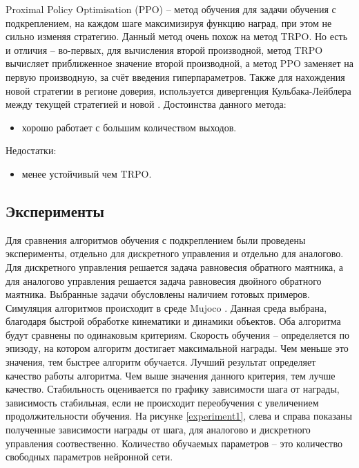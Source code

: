 Proximal Policy Optimisation (PPO) -- метод обучения для задачи обучения с подкреплением, на каждом шаге максимизируя функцию наград, при этом не сильно изменяя стратегию. 
Данный метод очень похож на метод TRPO. 
Но есть и отличия -- во-первых, для вычисления второй производной, метод TRPO вычисляет приближенное значение второй производной, а  метод PPO  заменяет на первую производную, за счёт введения гиперпараметров. 
Также для нахождения новой стратегии в регионе доверия, используется дивергенция Кульбака-Лейблера между текущей стратегией и новой \cite{ppo}.
Достоинства данного метода:
\begin{itemize}
	\item хорошо работает с большим количеством выходов.
\end{itemize}

Недостатки:
\begin{itemize}
	\item менее устойчивый чем TRPO.
\end{itemize} 



\subsection{Эксперименты}
Для сравнения алгоритмов обучения с подкреплением были проведены эксперименты, отдельно для дискретного управления и отдельно для аналогово. 
Для дискретного управления решается задача равновесия обратного маятника, а для аналогово управления решается задача равновесия двойного обратного маятника. 
Выбранные задачи обусловлены наличием готовых примеров. 
Симуляция алгоритмов происходит в среде Mujoco \cite{mujoco}. Данная среда выбрана, благодаря быстрой обработке кинематики и динамики объектов.
Оба алгоритма будут сравнены по одинаковым критериям. 
Скорость обучения -- определяется по эпизоду, на котором алгоритм достигает максимальной награды. 
Чем меньше это значения, тем быстрее алгоритм обучается. 
Лучший результат определяет качество работы алгоритма. 
Чем выше значения данного критерия, тем лучше качество. 
Стабильность оценивается по графику зависимости шага от награды, зависимость стабильная, если не происходит переобучения с увеличением продолжительности обучения. 
На рисунке \ref{experiment1}, слева и справа показаны полученные зависимости награды от шага, для аналогово и дискретного управления соотвественно. 
Количество обучаемых параметров -- это количество свободных параметров нейронной сети. 


